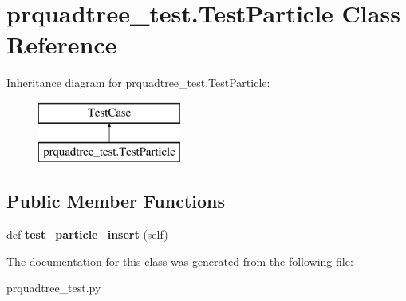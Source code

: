 \hypertarget{classprquadtree__test_1_1TestParticle}{}\section{prquadtree\+\_\+test.\+Test\+Particle Class Reference}
\label{classprquadtree__test_1_1TestParticle}
Inheritance diagram for prquadtree\+\_\+test.\+Test\+Particle\+:\begin{figure}[H]
\begin{center}
\leavevmode
\includegraphics[height=2.000000cm]{classprquadtree__test_1_1TestParticle}
\end{center}
\end{figure}
\subsection*{Public Member Functions}
\begin{DoxyCompactItemize}
\item 
\hypertarget{classprquadtree__test_1_1TestParticle_a64db3b2412e6487f7881ac2cf3e6a1a1}{}def {\bfseries test\+\_\+particle\+\_\+insert} (self)\label{classprquadtree__test_1_1TestParticle_a64db3b2412e6487f7881ac2cf3e6a1a1}

\end{DoxyCompactItemize}


The documentation for this class was generated from the following file\+:\begin{DoxyCompactItemize}
\item 
prquadtree\+\_\+test.\+py\end{DoxyCompactItemize}
